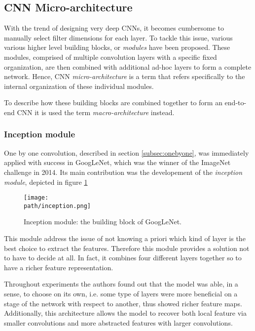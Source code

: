 \subsection{CNN Micro-architecture}
\label{subsec:arch}
With the trend of designing very deep CNNs, it becomes cumbersome to manually select filter dimensions for each layer. To tackle this issue, various various higher level building blocks, or \emph{modules} have been proposed. These modules, comprised of multiple convolution layers with a specific fixed organization, are then combined with additional ad-hoc layers to form a complete network. Hence, CNN \emph{micro-architecture} is a term that refers specifically to the internal organization of these individual modules. 

To describe how these building blocks are combined together to form an end-to-end CNN it is used the term \emph{macro-architecture} instead. 


\subsubsection{Inception module}
One by one convolution, described in section \ref{subsec:onebyone}, was immediately applied with success in GoogLeNet, which was the winner of the ImageNet challenge in 2014\parencite{googlenet}. Its main contribution was the developement of the \emph{inception module}, depicted in figure \ref{fig:inception}

\begin{figure}[h!]
 \centering
 \texttt{[image: \\path/inception.png]} 
 \caption{Inception module: the building block of GoogLeNet.}
 \label{fig:inception}
\end{figure}

This module address the issue of not knowing a priori which kind of layer is the best choice to extract the features. Therefore this module provides a solution not to have to decide at all. In fact, it combines four different layers together so to have a richer feature representation. 

Throughout experiments the authors found out that the model was able, in a sense, to choose on its own, i.e. some type of layers were more beneficial on a stage of the network with respect to another, thus showed richer feature maps. Additionally, this architecture allows the model to recover both local feature via smaller convolutions and more abstracted features with larger convolutions. 
\newline 

